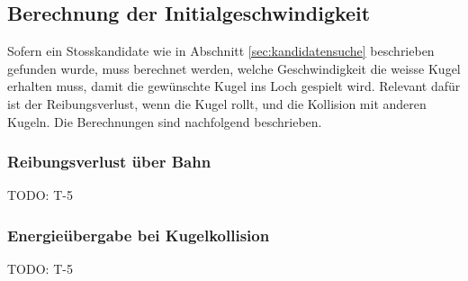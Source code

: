 \subsection{Berechnung der Initialgeschwindigkeit}
Sofern ein Stosskandidate wie in Abschnitt \ref{sec:kandidatensuche} beschrieben gefunden wurde, muss berechnet werden,
welche Geschwindigkeit die weisse Kugel erhalten muss, damit die gewünschte Kugel ins Loch gespielt wird.
Relevant dafür ist der Reibungsverlust, wenn die Kugel rollt, und die Kollision mit anderen Kugeln.
Die Berechnungen sind nachfolgend beschrieben.

\subsubsection{Reibungsverlust über Bahn}
TODO: T-5

\subsubsection{Energieübergabe bei Kugelkollision}
TODO: T-5
